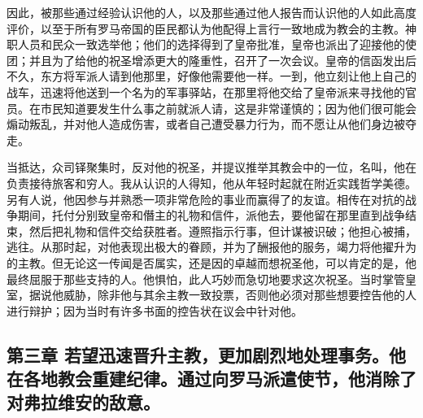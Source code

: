 因此，被那些通过经验认识他的人，以及那些通过他人报告而认识他的人如此高度评价，以至于所有罗马帝国的臣民都认为他配得上言行一致地成为教会的主教。神职人员和民众一致选举他；他们的选择得到了皇帝批准，皇帝也派出了迎接他的使团；并且为了给他的祝圣增添更大的隆重性，召开了一次会议。皇帝的信函发出后不久，东方将军派人请到他那里，好像他需要他一样。一到，他立刻让他上自己的战车，迅速将他送到一个名为的军事驿站，在那里将他交给了皇帝派来寻找他的官员。在市民知道要发生什么事之前就派人请，这是非常谨慎的；因为他们很可能会煽动叛乱，并对他人造成伤害，或者自己遭受暴力行为，而不愿让从他们身边被夺走。\par

当抵达，众司铎聚集时，反对他的祝圣，并提议推举其教会中的一位，名叫，他在负责接待旅客和穷人。我从认识的人得知，他从年轻时起就在附近实践哲学美德。另有人说，他因参与并熟悉一项非常危险的事业而赢得了的友谊。相传在对抗的战争期间，托付分别致皇帝和僭主的礼物和信件，派他去，要他留在那里直到战争结束，然后把礼物和信件交给获胜者。遵照指示行事，但计谋被识破；他担心被捕，逃往。从那时起，对他表现出极大的眷顾，并为了酬报他的服务，竭力将他擢升为的主教。但无论这一传闻是否属实，还是因的卓越而想祝圣他，可以肯定的是，他最终屈服于那些支持的人。他惧怕，此人巧妙而急切地要求这次祝圣。当时掌管皇室，据说他威胁，除非他与其余主教一致投票，否则他必须对那些想要控告他的人进行辩护；因为当时有许多书面的控告状在议会中针对他。\newline{}\par


\subsection{第三章 若望迅速晋升主教，更加剧烈地处理事务。他在各地教会重建纪律。通过向罗马派遣使节，他消除了对弗拉维安的敌意。}

